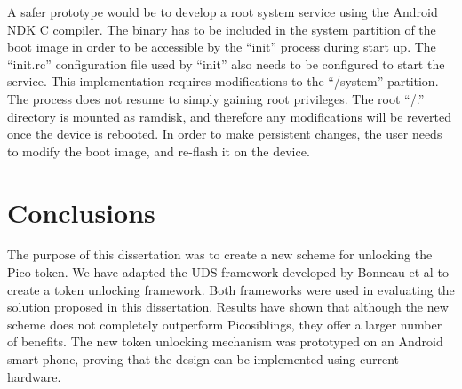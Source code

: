A safer prototype would be to develop a root system service using the Android NDK C compiler. The binary has to be included in the system partition of the boot image in order to be accessible by the ``init'' process during start up. The ``init.rc'' configuration file used by ``init'' also needs to be configured to start the service. This implementation requires modifications to the ``/system'' partition. The process does not resume to simply gaining root privileges. The root ``/.'' directory is mounted as ramdisk, and therefore any modifications will be reverted once the device is rebooted. In order to make persistent changes, the user needs to modify the boot image, and re-flash it on the device.

\section{Conclusions}
The purpose of this dissertation was to create a new scheme for unlocking the Pico token. We have adapted the UDS framework developed by Bonneau et al \cite{bonneau2012quest} to create a token unlocking framework. Both frameworks were used in evaluating the solution proposed in this dissertation. Results have shown that although the new scheme does not completely outperform Picosiblings, they offer a larger number of benefits. The new token unlocking mechanism was prototyped on an Android smart phone, proving that the design can be implemented using current hardware.


